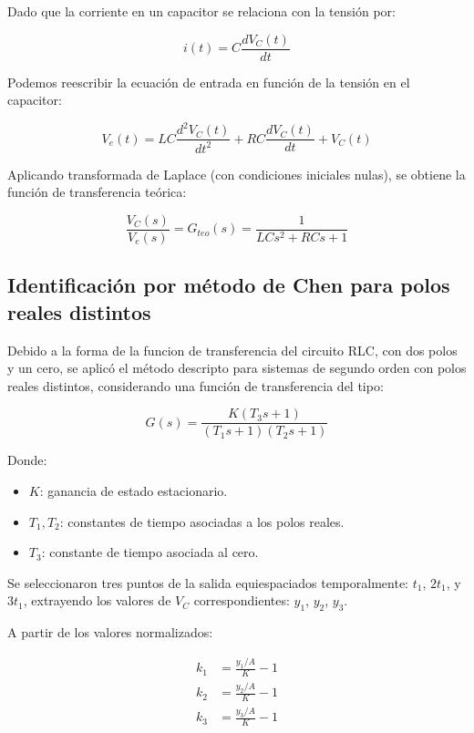 \documentclass{article}
\begin{document}
Dado que la corriente en un capacitor se relaciona con la tensión por:

\begin{equation}
i(t) = C \frac{dV_C(t)}{dt}
\end{equation}

Podemos reescribir la ecuación de entrada en función de la tensión en el capacitor:

\begin{equation}
V_e(t) = LC \frac{d^2V_C(t)}{dt^2} + RC \frac{dV_C(t)}{dt} + V_C(t)
\end{equation}

Aplicando transformada de Laplace (con condiciones iniciales nulas), se obtiene la función de transferencia teórica:

\begin{equation}
    \frac{V_C(s)}{V_e(s)} =G_{teo}(s)= \frac{1}{LC s^2 + RC s + 1}
\end{equation}


\subsection*{Identificación por método de Chen para polos reales distintos}
Debido a la forma de la funcion de transferencia del circuito RLC, con dos polos y un cero, se aplicó el método descripto para sistemas de segundo orden con polos reales distintos, considerando una función de transferencia del tipo:

\begin{equation}
G(s) = \frac{K(T_3 s + 1)}{(T_1 s + 1)(T_2 s + 1)}
\end{equation}

Donde:
\begin{itemize}
    \item $K$: ganancia de estado estacionario.
    \item $T_1, T_2$: constantes de tiempo asociadas a los polos reales.
    \item $T_3$: constante de tiempo asociada al cero.
\end{itemize}


Se seleccionaron tres puntos de la salida equiespaciados temporalmente: $t_1$, $2t_1$, y $3t_1$, extrayendo los valores de $V_C$ correspondientes: $y_1$, $y_2$, $y_3$.

A partir de los valores normalizados:

\begin{align}
k_1 &= \frac{y_1 / A}{K} - 1 \\
k_2 &= \frac{y_2 / A}{K} - 1 \\
k_3 &= \frac{y_3 / A}{K} - 1
\end{align}
\end{document}
